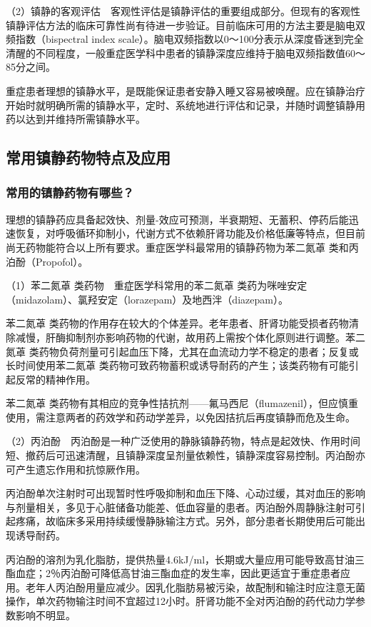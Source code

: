 （2）镇静的客观评估　客观性评估是镇静评估的重要组成部分。但现有的客观性镇静评估方法的临床可靠性尚有待进一步验证。目前临床可用的方法主要是脑电双频指数（bispectral
index
scale）。脑电双频指数以0～100分表示从深度昏迷到完全清醒的不同程度，一般重症医学科中患者的镇静深度应维持于脑电双频指数值60～85分之间。

重症患者理想的镇静水平，是既能保证患者安静入睡又容易被唤醒。应在镇静治疗开始时就明确所需的镇静水平，定时、系统地进行评估和记录，并随时调整镇静用药以达到并维持所需镇静水平。

\subsection{常用镇静药物特点及应用}

\subsubsection{常用的镇静药物有哪些？}

理想的镇静药应具备起效快、剂量-效应可预测，半衰期短、无蓄积、停药后能迅速恢复，对呼吸循环抑制小，代谢方式不依赖肝肾功能及价格低廉等特点，但目前尚无药物能符合以上所有要求。重症医学科最常用的镇静药物为苯二氮䓬
类和丙泊酚（Propofol）。

（1）苯二氮䓬
类药物　重症医学科常用的苯二氮䓬
类药为咪唑安定（midazolam）、氯羟安定（lorazepam）及地西泮（diazepam）。

苯二氮䓬
类药物的作用存在较大的个体差异。老年患者、肝肾功能受损者药物清除减慢，肝酶抑制剂亦影响药物的代谢，故用药上需按个体化原则进行调整。苯二氮䓬
类药物负荷剂量可引起血压下降，尤其在血流动力学不稳定的患者；反复或长时间使用苯二氮䓬
类药物可致药物蓄积或诱导耐药的产生；该类药物有可能引起反常的精神作用。

苯二氮䓬
类药物有其相应的竞争性拮抗剂------氟马西尼（flumazenil），但应慎重使用，需注意两者的药效学和药动学差异，以免因拮抗后再度镇静而危及生命。

（2）丙泊酚　丙泊酚是一种广泛使用的静脉镇静药物，特点是起效快、作用时间短、撤药后可迅速清醒，且镇静深度呈剂量依赖性，镇静深度容易控制。丙泊酚亦可产生遗忘作用和抗惊厥作用。

丙泊酚单次注射时可出现暂时性呼吸抑制和血压下降、心动过缓，其对血压的影响与剂量相关，多见于心脏储备功能差、低血容量的患者。丙泊酚外周静脉注射可引起疼痛，故临床多采用持续缓慢静脉输注方式。另外，部分患者长期使用后可能出现诱导耐药。

丙泊酚的溶剂为乳化脂肪，提供热量4.6kJ/ml，长期或大量应用可能导致高甘油三酯血症；2％丙泊酚可降低高甘油三酯血症的发生率，因此更适宜于重症患者应用。老年人丙泊酚用量应减少。因乳化脂肪易被污染，故配制和输注时应注意无菌操作，单次药物输注时间不宜超过12小时。肝肾功能不全对丙泊酚的药代动力学参数影响不明显。

